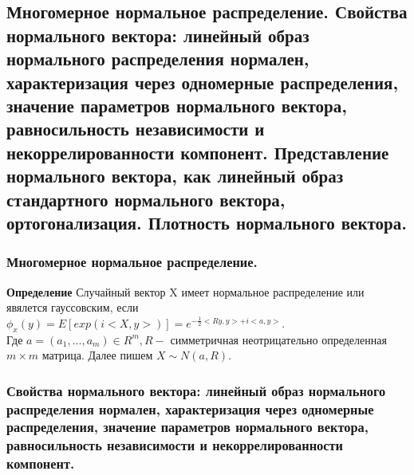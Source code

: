 \subsection{Многомерное нормальное распределение. Свойства нормального вектора: линейный образ нормального распределения нормален, характеризация через одномерные распределения, значение параметров нормального вектора, равносильность независимости и некоррелированности компонент. Представление нормального вектора, как линейный образ стандартного нормального вектора, ортогонализация. Плотность нормального вектора.}

\subsubsection{Многомерное нормальное распределение.}

\textbf{Определение} Случайный вектор X имеет нормальное распределение или явялется гауссовским, если $\phi_x(y) = E[exp(i<X, y>)] = e^{-\frac{1}{2}<Ry, y> + i<a, y>}$.\\
Где $a = (a_1, ..., a_m) \in R^m, R -$ симметричная неотрицательно определенная $m\times m$ матрица. Далее пишем $X \sim N(a, R)$.\\

\subsubsection{Свойства нормального вектора: линейный образ нормального распределения нормален, характеризация через одномерные распределения, значение параметров нормального вектора, равносильность независимости и некоррелированности компонент.}

